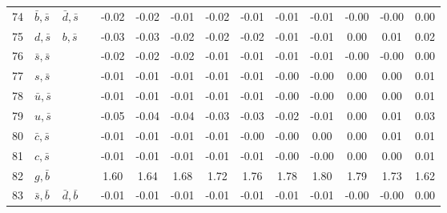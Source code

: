 \begin{tabularx}{\textwidth}{rXXX@{}S@{}S@{}S@{}S@{}S@{}S@{}S@{}S@{}S@{}S}
 74 & $\bar b, \bar s$ & $\bar d, \bar s$  &                  & -0.02 & -0.02 & -0.01 & -0.02 & -0.01 & -0.01 & -0.01 & -0.00 & -0.00 &  0.00 \\
 75 & $d, \bar s$      & $b, \bar s$       &                  & -0.03 & -0.03 & -0.02 & -0.02 & -0.02 & -0.01 & -0.01 &  0.00 &  0.01 &  0.02 \\
 76 & $\bar s, \bar s$ &                   &                  & -0.02 & -0.02 & -0.02 & -0.01 & -0.01 & -0.01 & -0.01 & -0.00 & -0.00 &  0.00 \\
 77 & $s, \bar s$      &                   &                  & -0.01 & -0.01 & -0.01 & -0.01 & -0.01 & -0.00 & -0.00 &  0.00 &  0.00 &  0.01 \\
 78 & $\bar u, \bar s$ &                   &                  & -0.01 & -0.01 & -0.01 & -0.01 & -0.01 & -0.00 & -0.00 &  0.00 &  0.00 &  0.01 \\
 79 & $u, \bar s$      &                   &                  & -0.05 & -0.04 & -0.04 & -0.03 & -0.03 & -0.02 & -0.01 &  0.00 &  0.01 &  0.03 \\
 80 & $\bar c, \bar s$ &                   &                  & -0.01 & -0.01 & -0.01 & -0.01 & -0.00 & -0.00 &  0.00 &  0.00 &  0.01 &  0.01 \\
 81 & $c, \bar s$      &                   &                  & -0.01 & -0.01 & -0.01 & -0.01 & -0.01 & -0.00 & -0.00 &  0.00 &  0.00 &  0.01 \\
 82 & $g, \bar b$      &                   &                  &  1.60 &  1.64 &  1.68 &  1.72 &  1.76 &  1.78 &  1.80 &  1.79 &  1.73 &  1.62 \\
 83 & $\bar s, \bar b$ & $\bar d, \bar b$  &                  & -0.01 & -0.01 & -0.01 & -0.01 & -0.01 & -0.01 & -0.01 & -0.00 & -0.00 &  0.00 \\
\bottomrule
\end{tabularx}







